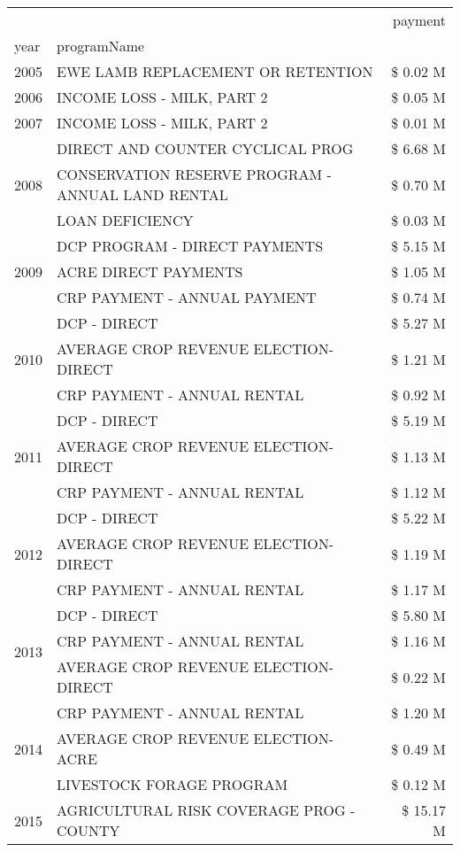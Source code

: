 \begin{tabular}{llr}
\toprule
 &  & payment \\
year & programName &  \\
\midrule
2005 & EWE LAMB REPLACEMENT OR RETENTION & \$ 0.02 M \\
\cline{1-3}
2006 & INCOME LOSS - MILK, PART 2 & \$ 0.05 M \\
\cline{1-3}
2007 & INCOME LOSS - MILK, PART 2 & \$ 0.01 M \\
\cline{1-3}
\multirow[t]{3}{*}{2008} & DIRECT AND COUNTER CYCLICAL PROG & \$ 6.68 M \\
 & CONSERVATION RESERVE PROGRAM - ANNUAL LAND RENTAL & \$ 0.70 M \\
 & LOAN DEFICIENCY & \$ 0.03 M \\
\cline{1-3}
\multirow[t]{3}{*}{2009} & DCP PROGRAM - DIRECT PAYMENTS & \$ 5.15 M \\
 & ACRE DIRECT PAYMENTS & \$ 1.05 M \\
 & CRP PAYMENT - ANNUAL PAYMENT & \$ 0.74 M \\
\cline{1-3}
\multirow[t]{3}{*}{2010} & DCP - DIRECT & \$ 5.27 M \\
 & AVERAGE CROP REVENUE ELECTION-DIRECT & \$ 1.21 M \\
 & CRP PAYMENT - ANNUAL RENTAL & \$ 0.92 M \\
\cline{1-3}
\multirow[t]{3}{*}{2011} & DCP - DIRECT & \$ 5.19 M \\
 & AVERAGE CROP REVENUE ELECTION-DIRECT & \$ 1.13 M \\
 & CRP PAYMENT - ANNUAL RENTAL & \$ 1.12 M \\
\cline{1-3}
\multirow[t]{3}{*}{2012} & DCP - DIRECT & \$ 5.22 M \\
 & AVERAGE CROP REVENUE ELECTION-DIRECT & \$ 1.19 M \\
 & CRP PAYMENT - ANNUAL RENTAL & \$ 1.17 M \\
\cline{1-3}
\multirow[t]{3}{*}{2013} & DCP - DIRECT & \$ 5.80 M \\
 & CRP PAYMENT - ANNUAL RENTAL & \$ 1.16 M \\
 & AVERAGE CROP REVENUE ELECTION-DIRECT & \$ 0.22 M \\
\cline{1-3}
\multirow[t]{3}{*}{2014} & CRP PAYMENT - ANNUAL RENTAL & \$ 1.20 M \\
 & AVERAGE CROP REVENUE ELECTION-ACRE & \$ 0.49 M \\
 & LIVESTOCK FORAGE PROGRAM & \$ 0.12 M \\
\cline{1-3}
\multirow[t]{3}{*}{2015} & AGRICULTURAL RISK COVERAGE PROG - COUNTY & \$ 15.17 M \\

\end{tabular}
